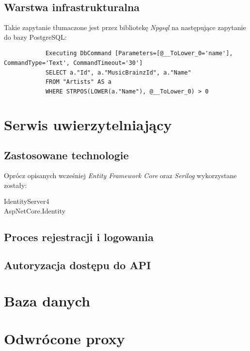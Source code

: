 	\subsection{Warstwa infrastrukturalna}

		Takie zapytanie tłumaczone jest przez bibliotekę \emph{Npgsql} na następujące zapytanie do bazy PostgreSQL:
		\begin{lstlisting}
			Executing DbCommand [Parameters=[@__ToLower_0='name'], CommandType='Text', CommandTimeout='30']
			SELECT a."Id", a."MusicBrainzId", a."Name"
			FROM "Artists" AS a
			WHERE STRPOS(LOWER(a."Name"), @__ToLower_0) > 0
		\end{lstlisting}
	
\section{Serwis uwierzytelniający}
	\subsection{Zastosowane technologie}
		Oprócz opisanych wcześniej \emph{Entity Framework Core} oraz \emph{Serilog} wykorzystane zostały:
		\begin{description}
			\item[IdentityServer4] 
			\item[AspNetCore.Identity] 
		\end{description}

	\subsection{Proces rejestracji i logowania}

	\subsection{Autoryzacja dostępu do API}

\section{Baza danych}

\section{Odwrócone proxy}